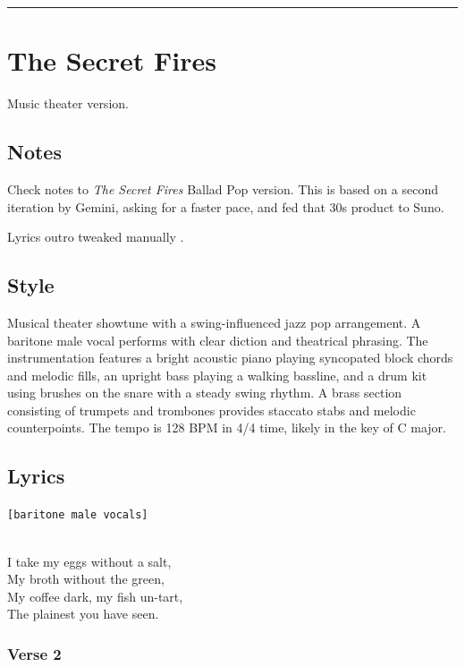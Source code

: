 \begin{center}\rule{0.5\linewidth}{0.5pt}\end{center}

\section{The Secret Fires}\label{the-secret-fires-1}

Music theater version.

\subsection{Notes}\label{notes-8}

Check notes to \emph{The Secret Fires} Ballad Pop version. This is based
on a second iteration by Gemini, asking for a faster pace, and fed that
30s product to Suno.

Lyrics outro tweaked manually .

\subsection{Style}\label{style-7}

Musical theater showtune with a swing-influenced jazz pop arrangement. A
baritone male vocal performs with clear diction and theatrical phrasing.
The instrumentation features a bright acoustic piano playing syncopated
block chords and melodic fills, an upright bass playing a walking
bassline, and a drum kit using brushes on the snare with a steady swing
rhythm. A brass section consisting of trumpets and trombones provides
staccato stabs and melodic counterpoints. The tempo is 128 BPM in 4/4
time, likely in the key of C major.

\subsection{Lyrics}\label{lyrics-7}

\texttt{{[}baritone\ male\ vocals{]}}\strut \\
I take my eggs without a salt,\\
My broth without the green,\\
My coffee dark, my fish un-tart,\\
The plainest you have seen.

\subsubsection{Verse 2}\label{verse-2-2}

